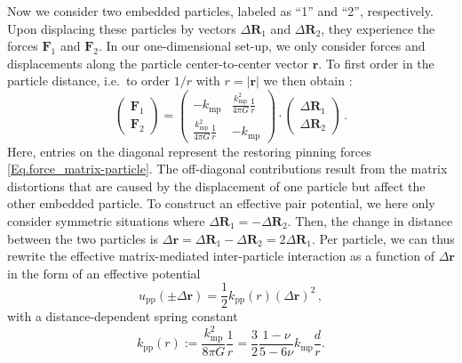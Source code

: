 \documentclass[aps,pre,twocolumn,superscriptaddress,nofootinbib]{revtex4}
\begin{document}
Now we consider two embedded particles, labeled as ``1'' and ``2'', respectively. 
Upon displacing these particles by vectors $\Delta \mathbf{R}_1$ and $\Delta \mathbf{R}_2$, they experience the forces $\mathbf{F}_1$ and $\mathbf{F}_2$. 
In our one-dimensional set-up, we only consider forces and displacements along the particle center-to-center vector $\mathbf{r}$. 
To first order in the particle distance, i.e.\, to order $1/r$ with $r=|\mathbf{r}|$ we then obtain \cite{Puljiz2016_PhysRevLett,Puljiz2016_arXiv,Phan-Thien1994_ZAngewMathPhys,Phan-Thien1993_JElasticity}: 
% 
\begin{equation}
  \left( \begin{array}{c}\mathbf{F}_1\\[.1cm] \mathbf{F}_2\end{array} \right) =
  \left( \begin{array}{cc} -k_\textrm{mp} & \frac{k_\textrm{mp}^2}{4\pi G}\frac{1}{r}\\[.1cm]
  \frac{k_\textrm{mp}^2}{4\pi G}\frac{1}{r} & -k_\textrm{mp} \end{array} \right) \cdot 
  \left( \begin{array}{c}\Delta \mathbf{R}_1\\[.1cm] \Delta \mathbf{R}_2\end{array} \right) \, .
  \label{Eq.force-displacement-relation}
\end{equation}
%
Here, entries on the diagonal represent the restoring pinning forces \eqref{Eq.force_matrix-particle}. 
The off-diagonal contributions result from the matrix distortions that are caused by the displacement of one particle but affect the other embedded particle. 
To construct an effective pair potential, we here only consider symmetric situations where $\Delta \mathbf{R}_1 = -\Delta \mathbf{R}_2$.
Then, the change in distance between the two particles is $\Delta \mathbf{r} = \Delta \mathbf{R}_1 - \Delta \mathbf{R}_2 = 2\Delta \mathbf{R}_1$. 
Per particle, we can thus rewrite the effective matrix-mediated inter-particle interaction as a function of $\Delta \mathbf{r}$ in the form of an effective potential
%
\begin{equation}
	u_\textrm{pp}(\pm \Delta \mathbf{r}) = \frac{1}{2} k_\textrm{pp}(r)(\Delta \mathbf{r})^2 \, ,
	\label{Eq.matrix-mediated_pair-potential} 
\end{equation}
%
with a distance-dependent spring constant
%
\begin{equation}
	k_\textrm{pp}(r) := \frac{k_\textrm{mp}^2}{8\pi G}\frac{1}{r} = \frac{3}{2} \frac{1 - \nu}{5 - 6\nu} k_\textrm{mp} \frac{d}{r}. 
	\label{Eq.kpp_distance_dependent}
\end{equation}
% 
\end{document}
